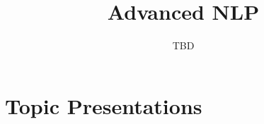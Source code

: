 \documentclass[11p]{book}
\title{Advanced NLP}
\author{TBD}
\begin{document}
\maketitle

\pagestyle{plain}

\tableofcontents
\setcounter{tocdepth}{3}


\pagestyle{fancyplain}
\addtolength{\headwidth}{\marginparsep}
\addtolength{\headwidth}{\marginparwidth}
\renewcommand{\chaptermark}[1]{\markboth{#1}{}}
\renewcommand{\sectionmark}[1]{\markright{\thesection\ #1}}
\lhead[\fancyplain{}{\bfseries\thepage}]
   {\fancyplain{}{\bfseries\rightmark}}
\rhead[\fancyplain{}{\bfseries\leftmark}]
   {\fancyplain{}{\bfseries\thepage}}
\cfoot{}

\pagestyle{fancyplain}
\addtolength{\headwidth}{\marginparsep}
\addtolength{\headwidth}{\marginparwidth}
\renewcommand{\chaptermark}[1]{\markboth{#1}{}}
\renewcommand{\sectionmark}[1]{\markright{\thesection\ #1}}
\lhead[\fancyplain{}{\bfseries\thepage}]
   {\fancyplain{}{\bfseries\rightmark}}
\rhead[\fancyplain{}{\bfseries\leftmark}]
   {\fancyplain{}{\bfseries\thepage}}
\cfoot{}

\part{Topic Presentations}

\printbibliography
\end{document}

